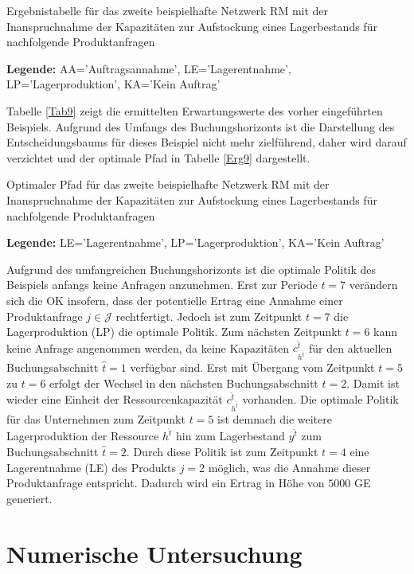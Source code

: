 \begin{table}
\begin{footnotesize}
    \caption{Ergebnistabelle für das zweite beispielhafte Netzwerk RM mit der Inanspruchnahme der Kapazitäten zur Aufstockung eines Lagerbestands für nachfolgende Produktanfragen} \label{Tab9}
    \vspace*{3mm}
    \begin{center}
      {\footnotesize \textbf{Legende:} AA='Auftragsannahme', LE='Lagerentnahme', LP='Lagerproduktion', KA='Kein Auftrag'} 
      \end{center}
\end{footnotesize}
\end{table}

Tabelle \ref{Tab9} zeigt die ermittelten Erwartungswerte des vorher eingeführten Beispiels. Aufgrund des Umfangs des Buchungshorizonts ist die Darstellung des Entscheidungsbaums für dieses Beispiel nicht mehr zielführend, daher wird darauf verzichtet und der optimale Pfad in Tabelle \ref{Erg9} dargestellt.

\begin{table}
\begin{footnotesize}
    \caption{Optimaler Pfad für das zweite beispielhafte Netzwerk RM mit der Inanspruchnahme der Kapazitäten zur Aufstockung eines Lagerbestands für nachfolgende Produktanfragen} \label{Erg9}
    \vspace*{3mm}
        \begin{center}
      \end{center}
        \begin{center}
      {\footnotesize \textbf{Legende:} LE='Lagerentnahme', LP='Lagerproduktion', KA='Kein Auftrag'} 
      \end{center}
\end{footnotesize}
\end{table}

Aufgrund des umfangreichen Buchungshorizonts ist die optimale Politik des Beispiels anfangs keine Anfragen anzunehmen. Erst zur Periode $t=7$ verändern sich die OK insofern, dass der potentielle Ertrag eine Annahme einer Produktanfrage $j\in\mathcal{J}$ rechtfertigt. Jedoch ist zum Zeitpunkt $t=7$ die Lagerproduktion (LP) die optimale Politik. Zum nächsten Zeitpunkt $t=6$ kann keine Anfrage angenommen werden, da keine Kapazitäten $c^{\hat{t}}_{h^{\hat{t}}}$ für den aktuellen Buchungsabschnitt $\hat{t}=1$ verfügbar sind. Erst mit Übergang vom Zeitpunkt $t=5$ zu $t=6$ erfolgt der Wechsel in den nächsten Buchungsabschnitt $\hat{t}=2$. Damit ist wieder eine Einheit der Ressourcenkapazität $c^{\hat{t}}_{h^{\hat{t}}}$ vorhanden. Die optimale Politik für das Unternehmen zum Zeitpunkt $t=5$ ist demnach die weitere Lagerproduktion der Ressource $h^{\hat{t}}$ hin zum Lagerbestand $y^{\hat{t}}$ zum Buchungsabschnitt $\hat{t}=2$. Durch diese Politik ist zum Zeitpunkt $t=4$ eine Lagerentnahme (LE) des Produkts $j=2$ möglich, was die Annahme dieser Produktanfrage entspricht. Dadurch wird ein Ertrag in Höhe von $5000$ GE generiert.

\section{Numerische Untersuchung}